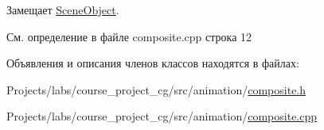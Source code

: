Замещает \hyperlink{class_scene_object_a1b8a4b90f1200f1cd025d95964d43630}{Scene\+Object}.



См. определение в файле composite.\+cpp строка 12



Объявления и описания членов классов находятся в файлах\+:\begin{DoxyCompactItemize}
\item 
Projects/labs/course\+\_\+project\+\_\+cg/src/animation/\hyperlink{composite_8h}{composite.\+h}\item 
Projects/labs/course\+\_\+project\+\_\+cg/src/animation/\hyperlink{composite_8cpp}{composite.\+cpp}\end{DoxyCompactItemize}
